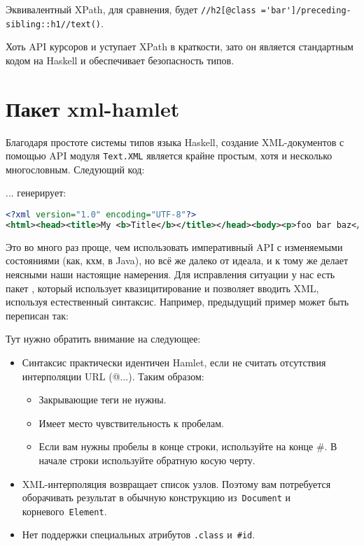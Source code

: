 \begin{remark}
Эквивалентный XPath, для сравнения, будет \lstinline!//h2[@class ='bar']/preceding-sibling::h1//text()!.
\end{remark}

Хоть API курсоров и уступает XPath в краткости, зато он является стандартным кодом на Haskell и обеспечивает безопасность типов.

\section{Пакет xml-hamlet}
Благодаря простоте системы типов языка Haskell, создание XML-документов с помощью API модуля \lstinline!Text.XML! является крайне простым, хотя и несколько многословным. Следующий код:


... генерирует:

\begin{lstlisting}[language=XML]
<?xml version="1.0" encoding="UTF-8"?>
<html><head><title>My <b>Title</b></title></head><body><p>foo bar baz</p></body></html>
\end{lstlisting}

Это во много раз проще, чем использовать императивный API с изменяемыми состояниями (как, кхм, в Java), но всё же далеко от идеала, и к тому же делает неясными наши настоящие намерения. Для исправления ситуации у нас есть пакет , который использует квазицитирование и позволяет вводить XML, используя естественный синтаксис. Например, предыдущий пример может быть переписан так:


Тут нужно обратить внимание на следующее:
\begin{itemize}
  \item Синтаксис практически идентичен Hamlet, если не считать отсутствия интерполяции URL (@{...}). Таким образом:
    \begin{itemize}
      \item Закрывающие теги не нужны.
      \item Имеет место чувствительность к пробелам.
      \item Если вам нужны пробелы в конце строки, используйте на конце \#. В начале строки используйте обратную косую черту.
    \end{itemize}
  
  \item XML-интерполяция возвращает список узлов. Поэтому вам потребуется оборачивать результат в обычную конструкцию из~\lstinline!Document! и корневого~\lstinline!Element!.
  \item Нет поддержки специальных атрибутов \lstinline!.class! и~\lstinline!#id!.
\end{itemize}


